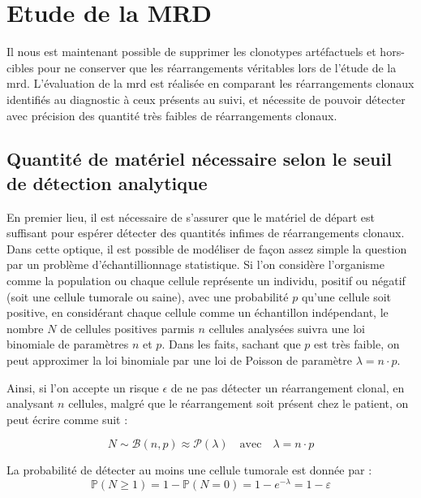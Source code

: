 \section{Etude de la MRD}

Il nous est maintenant possible de supprimer les clonotypes artéfactuels et hors-cibles pour ne conserver que les réarrangements véritables lors de 
l'étude de la \gls{mrd}. L'évaluation de la \gls{mrd} est réalisée en comparant les réarrangements clonaux identifiés au diagnostic à ceux présents 
au suivi, et nécessite de pouvoir détecter avec précision des quantité très faibles de réarrangements clonaux.

\subsection{Quantité de matériel nécessaire selon le seuil de détection analytique}

En premier lieu, il est nécessaire de s'assurer que le matériel de départ est suffisant pour espérer détecter des quantités infimes de réarrangements 
clonaux. Dans cette optique, il est possible de modéliser de façon assez simple la question par un problème d'échantillionnage statistique. Si l'on considère 
l'organisme comme la population ou chaque cellule représente un individu, positif ou négatif (soit une cellule tumorale ou saine), avec une probabilité $p$ 
qu'une cellule soit positive, en considérant chaque cellule comme un échantillon indépendant, le nombre $N$ de cellules positives parmis $n$ cellules analysées 
suivra une loi binomiale de paramètres $n$ et $p$. Dans les faits, sachant que $p$ est très faible, on peut approximer la loi binomiale par une loi de Poisson de 
paramètre $\lambda = n \cdot p$. 

\vspace{1em}

Ainsi, si l'on accepte un risque $\epsilon$ de ne pas détecter un réarrangement clonal, en analysant $n$ cellules, malgré que le réarrangement soit présent chez le 
patient, on peut écrire comme suit :

\begin{equation}
    N \sim \mathcal{B}(n, p) \approx \mathcal{P}(\lambda)
    \quad \text{avec} \quad \lambda = n \cdot p
\end{equation}

La probabilité de détecter au moins une cellule tumorale est donnée par :
\begin{equation}
    \mathbb{P}(N \geq 1) = 1 - \mathbb{P}(N = 0) = 1 - e^{-\lambda} = 1 - \varepsilon
\end{equation}

